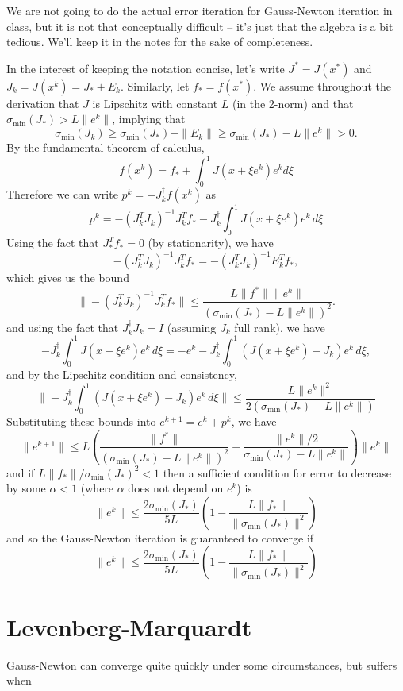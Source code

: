 \documentclass[12pt, leqno]{article} %
\begin{document}
We are not going to do the actual error iteration for Gauss-Newton
iteration in class, but it is not that conceptually difficult -- it's
just that the algebra is a bit tedious. We'll keep it in the notes for
the sake of completeness.

In the interest of keeping the notation concise, let's write
\(J^* = J(x^*)\) and \(J_k = J(x^k) = J_* + E_k\). Similarly, let
\(f_* = f(x^*)\). We assume throughout the derivation that \(J\) is
Lipschitz with constant \(L\) (in the 2-norm) and that
\(\sigma_{\min}(J_*) > L \|e^k\|\), implying that
\[\sigma_{\min}(J_k) \geq 
  \sigma_{\min}(J_*) - \|E_k\| \geq \sigma_{\min}(J_*)-L\|e^k\| > 0.\]
By the fundamental theorem of calculus,
\[f(x^k) = f_* + \int_0^1 J(x+\xi e^k) e^k d\xi\] Therefore we can write
\(p^k = -J_k^\dagger f(x^k)\) as \[p^k = -(J_k^T J_k)^{-1} J_k^T f_* 
  -J_k^\dagger \int_0^1 J(x+\xi e^k) e^k \, d\xi\] Using the fact that
\(J_*^T f_* = 0\) (by stationarity), we have
\[-(J_k^T J_k)^{-1} J_k^T f_* = -(J_k^T J_k)^{-1} E_k^T f_*,\] which
gives us the bound \[\|-(J_k^T J_k)^{-1} J_k^T f_*\| \leq 
  \frac{L \|f^*\| \|e^k\|}{\left( \sigma_{\min}(J_*)-L\|e^k\| \right)^2}.\]
and using the fact that \(J_k^\dagger J_k = I\) (assuming \(J_k\) full
rank), we have \[-J_k^\dagger \int_0^1 J(x+\xi e^k) e^k \, d\xi = 
  -e^k -J_k^\dagger \int_0^1 (J(x+\xi e^k)-J_k) e^k \, d\xi,\] and by
the Lipschitz condition and consistency,
\[\|-J_k^\dagger \int_0^1 (J(x+\xi e^k)-J_k) e^k \, d\xi\|
  \leq \frac{L\|e^k\|^2}{2(\sigma_{\min}(J_*)-L\|e^k\|)}\] Substituting
these bounds into \(e^{k+1} = e^k + p^k\), we have \[\|e^{k+1}\| \leq 
    L \left( \frac{\|f^*\|}{(\sigma_{\min}(J_*)-L\|e^k\|)^2} +
             \frac{\|e^k\|/2}{\sigma_{\min}(J_*)-L\|e^k\|} \right) \|e^k\|\]
and if \(L \|f_*\|/\sigma_{\min}(J_*)^2 < 1\) then a sufficient
condition for error to decrease by some \(\alpha < 1\) (where \(\alpha\)
does not depend on \(e^k\)) is
\[\|e^k\| \leq \frac{2\sigma_{\min}(J_*)}{5L} 
  \left( 1 - \frac{L\|f_*\|}{\|\sigma_{\min}(J_*)\|^2} \right)\] and so
the Gauss-Newton iteration is guaranteed to converge if
\[\|e^k\| \leq \frac{2\sigma_{\min}(J_*)}{5L} 
  \left( 1 - \frac{L\|f_*\|}{\|\sigma_{\min}(J_*)\|^2} \right)\]

\section{Levenberg-Marquardt}

Gauss-Newton can converge quite quickly under some circumstances, but
suffers when
\end{document}
